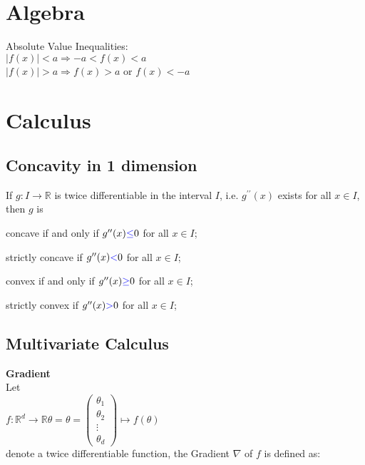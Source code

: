 \section{Algebra}
Absolute Value Inequalities:\\
$ |f(x)| < a  \Rightarrow  -a < f(x) < a$\\ 
$|f(x)| > a  \Rightarrow f(x) > a$ or $f(x) < -a$\\
\section{Calculus}
\subsection{Concavity in 1 dimension}
If $g:I \to \mathbb {R}$ is twice differentiable in the interval $I$, i.e. $g^{\prime \prime }(x)$ exists for all $x \in I$, then $g$  is

concave if and only if $g^{\prime \prime }(x) {\color{blue}{\leq }}  0$ for all $x \in I$;

strictly concave if $g^{\prime \prime }(x) {\color{blue}{<}}  0$ for all $x \in I$;

convex if and only if $g^{\prime \prime }(x) {\color{blue}{\geq }}  0$ for all $x \in I$;

strictly convex if $g^{\prime \prime }(x) {\color{blue}{>}}  0$ for all $x \in I$;

\subsection{Multivariate Calculus}
\textbf{Gradient}\\
Let\\
$f: \mathbb {R}^ d \longrightarrow \mathbb {R} \theta = \displaystyle \theta =\begin{pmatrix} \theta _1\\ \theta _2\\ \vdots \\ \theta _ d\end{pmatrix} \displaystyle \mapsto \displaystyle f(\theta )$\\
denote a twice differentiable function, the Gradient $\nabla$ of $f$ is defined as:

